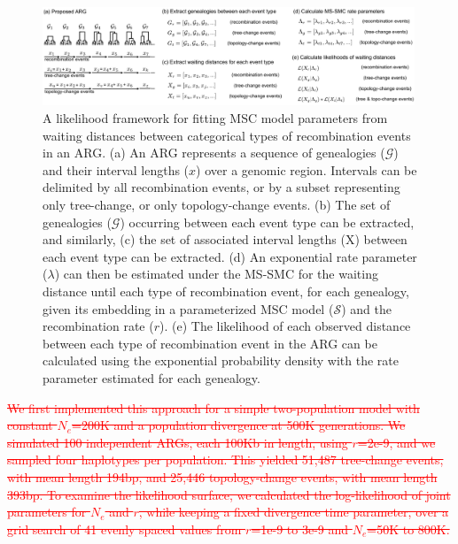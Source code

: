 \documentclass[11pt]{article}
\begin{document}
\begin{figure}[tp]
	\centering
	\includegraphics[width=0.99\textwidth]{figures/current/Fig6-ARG-likelihood-steps.pdf}	
	\caption{
		A likelihood framework for fitting MSC model parameters from waiting distances
		between categorical types of recombination events in an ARG.
		(a) An ARG represents a sequence of genealogies ($\mathcal{G}$) and their
		interval lengths ($x$) over a genomic region. Intervals can be delimited 
		by all recombination events, or by a subset representing only tree-change, 
		or only topology-change events.
		(b) The set of genealogies ($\mathcal{G}$) occurring between each event
		type can be extracted, and similarly, 
		(c) the set of associated interval lengths (X) between each event 
		type can be extracted.
		(d) An exponential rate parameter ($\lambda$) can then be estimated 
		under the MS-SMC for the waiting distance until each type of recombination
		event, for each genealogy, given its embedding in a parameterized MSC model
		($\mathcal{S}$) and the recombination rate ($r$).
		(e) The likelihood of each observed distance between each type of 
		recombination event in the ARG can be calculated using the exponential 
		probability density with the rate parameter estimated for each genealogy.
	}
	\label{fig:likelihood-calculation}
\end{figure}


\textcolor{red}{\sout{
We first implemented this approach for a simple two-population model with 
constant $N_e$=200K and a population divergence at 500K generations. 
We simulated 100 independent ARGs, each 100Kb in length, using $r$=2e-9, 
and we sampled four haplotypes per population. This 
yielded 51,487 tree-change events, with mean length 194bp, and 25,446 
topology-change events, with mean length 393bp. To examine the likelihood
surface, we calculated the log-likelihood of joint parameters for $N_e$ and $r$, 
while keeping a fixed divergence time parameter, over a grid search of 41
evenly spaced values from $r$=1e-9 to 3e-9 and 
$N_e$=50K to 800K.
}}
\end{document}
